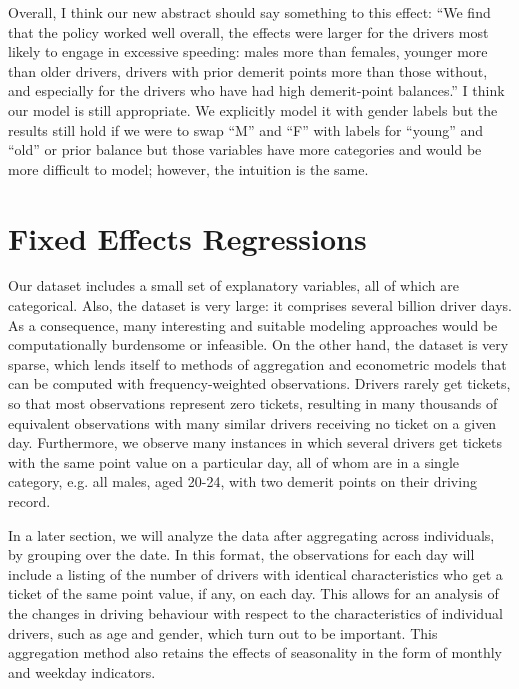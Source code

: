 \documentclass[12pt]{paper}
\begin{document}
Overall, I think our new abstract should say something to this effect: 
``We find that the policy worked well overall, the effects were larger for the drivers most likely to engage in excessive speeding: males more than females, younger more than older drivers, drivers with prior demerit points more than those without, and especially for the drivers who have had high demerit-point balances.'' 
I think our model is still appropriate. We explicitly model it with gender labels but the results still hold if we were to swap ``M'' and ``F'' with labels for ``young'' and ``old'' or prior balance
but those variables have more categories and would be more difficult to model; however, the intuition is the same. 


\section*{Fixed Effects Regressions}

Our dataset includes a small set of explanatory variables, all of which are categorical. 
Also, the dataset is very large: it comprises several billion driver days. 
As a consequence, many interesting and suitable modeling approaches would be computationally burdensome or infeasible. 
On the other hand, the dataset is very sparse, which lends itself to methods of aggregation and
econometric models that can be computed with frequency-weighted observations.
Drivers rarely get tickets, so that most observations represent zero tickets, 
resulting in many thousands of equivalent observations with many similar drivers 
receiving no ticket on a given day. 
Furthermore, we observe many instances in which several drivers 
get tickets with the same point value on a particular day, 
all of whom are in a single category, 
e.g. all males, aged 20-24, with two demerit points on their driving record. 

In a later section, we will analyze the data after aggregating across individuals, by grouping over the date. 
In this format, the observations for each day will include a listing of the number of drivers with identical characteristics who get a ticket of the same point value, if any, on each day. 
This allows for an analysis of the changes in driving behaviour with respect to 
the characteristics of individual drivers, such as age and gender, which turn out to be important. 
This aggregation method also retains the effects of seasonality in the form of monthly and weekday indicators. 
\end{document}
